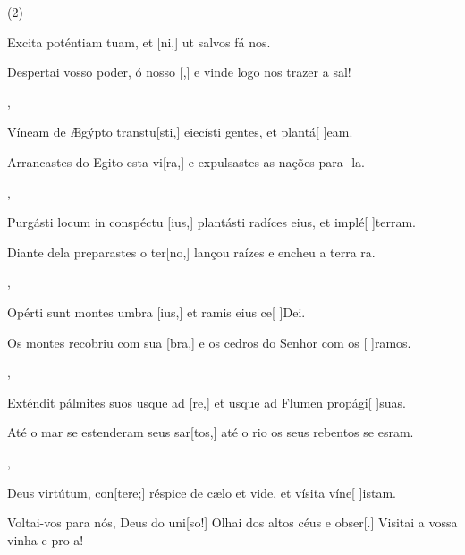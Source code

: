 \SetVersePairs(2){
  {\item {}Excita poténtiam tuam, et [ni,] ut salvos fá nos.~\Responsorium}%
    {\item {}Despertai vosso poder, ó nosso [,] e vinde logo nos trazer a sal!~\Responsorium},
  {\item {}Víneam de Ægýpto transtu[sti,] eiecísti gentes, et plantá[ ]{e}am.~\Responsorium}%
    {\item {}Arrancastes do Egito esta vi[ra,] e expulsastes as nações para -la.~\Responsorium},
  {\item {}Purgásti locum in conspéctu [ius,] plantásti radíces eius, et implé[ ]{ter}ram.~\Responsorium}%
    {\item {}Diante dela preparastes o ter[no,] lançou raízes e encheu a terra ra.~\Responsorium},
  {\item {}Opérti sunt montes umbra [ius,] et ramis eius ce[ ]{De}i.~\Responsorium}%
    {\item {}Os montes recobriu com sua [bra,] e os cedros do Senhor com os [ ]{ra}mos.~\Responsorium},
  {\item {}Exténdit pálmites suos usque ad [re,] et usque ad Flumen propági[ ]{su}as.~\Responsorium}%
    {\item {}Até o mar se estenderam seus sar[tos,] até o rio os seus rebentos se esram.~\Responsorium},
  {\item {}Deus virtútum, con[tere;] réspice de cæ\-lo et vide, et vísita víne[ ]{i}stam.~\Responsorium}%
    {\item {}Voltai-vos para nós, Deus do uni[so!] Olhai dos altos céus e obser[.] Visitai a vossa vinha e pro-a!~\Responsorium}
}